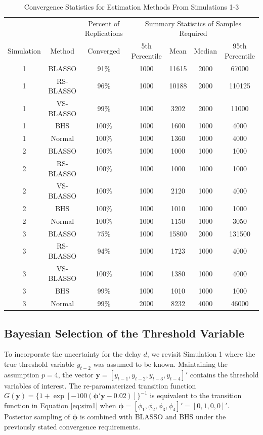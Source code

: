 \begin{table}[!h]
\scriptsize
  \centering
  \caption{Convergence Statistics for Estimation Methods From Simulations 1-3}
    \begin{tabular}{cc|c|cccc}
    \toprule
    & & Percent of Replications & \multicolumn{4}{c}{Summary Statistics of Samples Required}\\
    Simulation & Method & Converged  & 5th Percentile   & Mean & Median & 95th Percentile \\
    \midrule
    1    & BLASSO & 91\%   & 1000 & 11615 & 2000 & 67000 \\
    1    & RS-BLASSO & 96\%    & 1000 & 10188 & 2000 & 110125 \\
    1    & VS-BLASSO & 99\%    & 1000 & 3202 & 2000 & 11000 \\
    1    & BHS  & 100\%   & 1000 & 1600 & 1000 & 4000 \\
    1    & Normal & 100\%   & 1000 & 1360 & 1000 & 4000 \\
    \midrule
    2    & BLASSO & 100\%   & 1000 & 1000 & 1000 & 1000 \\
    2    & RS-BLASSO & 100\%   & 1000 & 1000 & 1000 & 1000 \\
    2    & VS-BLASSO & 100\%   & 1000 & 2120 & 1000 & 4000 \\
    2    & BHS  & 100\%   & 1000 & 1010 & 1000 & 1000 \\
    2    & Normal & 100\%   & 1000 & 1150 & 1000 & 3050 \\
    \midrule
    3    & BLASSO & 75\%    & 1000 & 15800 & 2000 & 131500 \\
    3    & RS-BLASSO & 94\%    & 1000 & 1723 & 1000 & 4000 \\
    3    & VS-BLASSO & 100\%   & 1000 & 1380 & 1000 & 4000 \\
    3    & BHS  & 99\%    & 1000 & 1010 & 1000 & 1000 \\
    3    & Normal & 99\%    & 2000 & 8232 & 4000 & 46000 \\
    \bottomrule
    \end{tabular}%
  \label{tab:convtable}%
\end{table}%

\vskip 3mm

\subsection{Bayesian Selection of the Threshold Variable}

To incorporate the uncertainty for the delay $d$, we revisit Simulation 1 where the true threshold variable $y_{t-2}$ was assumed to be known. Maintaining the assumption $p = 4$, the vector $\bm{y}=[y_{t-1},y_{t-2},y_{t-3},y_{t-4}]'$ contains the threshold variables of interest. The re-paramaterized transition function $G(\bm{y})=\{1+\exp[-100(\bm{\phi}'\bm{y}-0.02)]\}^{-1}$ is equivalent to the transition function in Equation \ref{eq:sim1} when $\bm{\phi}=[\phi_1,\phi_2,\phi_3,\phi_4]'=[0,1,0,0]'$. Posterior sampling of $\bm{\phi}$ is combined with BLASSO and BHS under the previously stated convergence requirements. 

